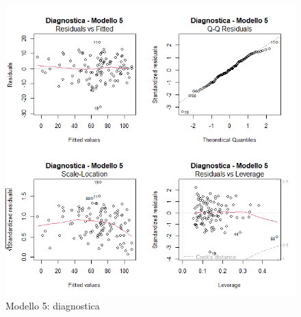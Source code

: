 \begin{figure}[H]
	\centering
	\includegraphics[width=0.75\linewidth]{../graphs/diagnostica/modello5}
	\caption{Modello 5: diagnostica}
	\label{fig:diagnostica_modello5}
\end{figure}

